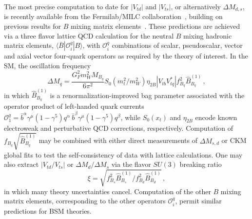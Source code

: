 The most precise computation to date for $|V_{td}|$ and $|V_{ts}|$, or alternatively $\Delta M_{d,s}$, is recently available from the Fermilab/MILC collaboration~\cite{Bazavov:2016nty}, building on previous results for $B$ mixing matrix elements~\cite{Aoki:2014nga,Carrasco:2013zta,Bazavov:2012zs,Albertus:2010nm,Gamiz:2009ku,Dalgic:2006gp}. These predictions are achieved via a three flavor lattice QCD  calculation for the neutral $B$ mixing hadronic matrix elements, $\langle \bar{B} | \mathcal{O}^q_i | B\rangle$, with $\mathcal{O}^q_i$ combinations of scalar, pseudoscalar, vector and axial vector four-quark operators as required by the theory of interest. In the SM, the oscillation frequency
\begin{equation}
	\label{eqn:SMDM}
	\Delta M_q = \frac{G_F^2 m_W^2 M_{B_q}}{6 \pi^2} S_0(m_t^2/m_W^2) \eta_{2 B}|V_{tb}V^*_{tq}| f_{B_q}^2 \hat{B}^{(1)}_{B_q}\,,
\end{equation}
in which $\hat{B}^{(1)}_{B_q}$ is a renormalization-improved bag parameter associated with the operator product of left-handed quark currents $\mathcal{O}^q_1 = \bar{b}^\alpha\gamma^\mu(1-\gamma^5) q^\alpha~\bar{b}^\beta \gamma^\mu(1-\gamma^5) q^\beta$, while $S_0(x_t)$ and $\eta_{2B}$ encode known electroweak and perturbative QCD corrections, respectively. Computation of $f_{B_q}\sqrt{\hat{B}^{(1)}_{B_q}}$ may be combined with either direct measurements of $\Delta M_{s,d}$ or CKM global fits to test the self-consistency of data with lattice calculations. One may also extract $|V_{td}/V_{ts}|$ or $\Delta M_d/\Delta M_s$ via the flavor $SU(3)$ breaking ratio 
\begin{equation}
\xi = \sqrt{f_{B_s}^2 \hat{B}^{(1)}_{B_s}/ f_{B_d}^2 \hat{B}^{(1)}_{B_d}}\,,
\end{equation}
in which many theory uncertainties cancel. Computation of the other $B$ mixing matrix elements, corresponding to the other operators $\mathcal{O}^q_i$, permit similar predictions for BSM theories.

